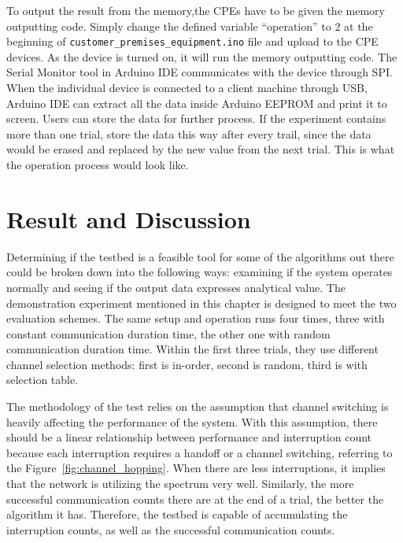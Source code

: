 To output the result from the memory,the CPEs have to be given the memory outputting code. Simply change the defined variable ``operation'' to 2 at the beginning of \texttt{customer\_premises\_equipment.ino} file and upload to the CPE devices. As the device is turned on, it will run the memory outputting code. The Serial Monitor tool in Arduino IDE communicates with the device through SPI. When the individual device is connected to a client machine through USB, Arduino IDE can extract all the data inside Arduino EEPROM and print it to screen. Users can store the data for further process. If the experiment contains more than one trial, store the data this way after every trail, since the data would be erased and replaced by the new value from the next trial. This is what the operation process would look like. 

\section{Result and Discussion}

Determining if the testbed is a feasible tool for some of the algorithms out there could be broken down into the following ways: examining if the system operates normally and seeing if the output data expresses analytical value. The demonstration experiment mentioned in this chapter is designed to meet the two evaluation schemes. The same setup and operation runs four times, three with constant communication duration time, the other one with random communication duration time. Within the first three trials, they use different channel selection methods: first is in-order, second is random, third is with selection table. 

The methodology of the test relies on the assumption that channel switching is heavily affecting the performance of the system. With this assumption, there should be a linear relationship between performance and interruption count because each interruption requires a handoff or a channel switching, referring to the Figure~\ref{fig:channel_hopping}. When there are less interruptions, it implies that the network is utilizing the spectrum very well. Similarly, the more successful communication counts there are at the end of a trial, the better the algorithm it has. Therefore, the testbed is capable of accumulating the interruption counts, as well as the successful communication counts.

